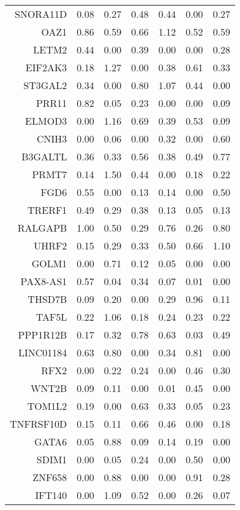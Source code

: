 \begin{longtable}{rrrrrrr}
  SNORA11D & 0.08 & 0.27 & 0.48 & 0.44 & 0.00 & 0.27 \\ 
  OAZ1 & 0.86 & 0.59 & 0.66 & 1.12 & 0.52 & 0.59 \\ 
  LETM2 & 0.44 & 0.00 & 0.39 & 0.00 & 0.00 & 0.28 \\ 
  EIF2AK3 & 0.18 & 1.27 & 0.00 & 0.38 & 0.61 & 0.33 \\ 
  ST3GAL2 & 0.34 & 0.00 & 0.80 & 1.07 & 0.44 & 0.00 \\ 
  PRR11 & 0.82 & 0.05 & 0.23 & 0.00 & 0.00 & 0.09 \\ 
  ELMOD3 & 0.00 & 1.16 & 0.69 & 0.39 & 0.53 & 0.09 \\ 
  CNIH3 & 0.00 & 0.06 & 0.00 & 0.32 & 0.00 & 0.60 \\ 
  B3GALTL & 0.36 & 0.33 & 0.56 & 0.38 & 0.49 & 0.77 \\ 
  PRMT7 & 0.14 & 1.50 & 0.44 & 0.00 & 0.18 & 0.22 \\ 
  FGD6 & 0.55 & 0.00 & 0.13 & 0.14 & 0.00 & 0.50 \\ 
  TRERF1 & 0.49 & 0.29 & 0.38 & 0.13 & 0.05 & 0.13 \\ 
  RALGAPB & 1.00 & 0.50 & 0.29 & 0.76 & 0.26 & 0.80 \\ 
  UHRF2 & 0.15 & 0.29 & 0.33 & 0.50 & 0.66 & 1.10 \\ 
  GOLM1 & 0.00 & 0.71 & 0.12 & 0.05 & 0.00 & 0.00 \\ 
  PAX8-AS1 & 0.57 & 0.04 & 0.34 & 0.07 & 0.01 & 0.00 \\ 
  THSD7B & 0.09 & 0.20 & 0.00 & 0.29 & 0.96 & 0.11 \\ 
  TAF5L & 0.22 & 1.06 & 0.18 & 0.24 & 0.23 & 0.22 \\ 
  PPP1R12B & 0.17 & 0.32 & 0.78 & 0.63 & 0.03 & 0.49 \\ 
  LINC01184 & 0.63 & 0.80 & 0.00 & 0.34 & 0.81 & 0.00 \\ 
  RFX2 & 0.00 & 0.22 & 0.24 & 0.00 & 0.46 & 0.30 \\ 
  WNT2B & 0.09 & 0.11 & 0.00 & 0.01 & 0.45 & 0.00 \\ 
  TOM1L2 & 0.19 & 0.00 & 0.63 & 0.33 & 0.05 & 0.23 \\ 
  TNFRSF10D & 0.15 & 0.11 & 0.66 & 0.46 & 0.00 & 0.18 \\ 
  GATA6 & 0.05 & 0.88 & 0.09 & 0.14 & 0.19 & 0.00 \\ 
  SDIM1 & 0.00 & 0.05 & 0.24 & 0.00 & 0.50 & 0.00 \\ 
  ZNF658 & 0.00 & 0.88 & 0.00 & 0.00 & 0.91 & 0.28 \\ 
  IFT140 & 0.00 & 1.09 & 0.52 & 0.00 & 0.26 & 0.07 \\ 

\end{longtable}
